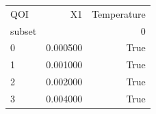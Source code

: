 \begin{tabular}{lrr}
\toprule
QOI & X1 & Temperature \\
subset &  & 0 \\
\midrule
0 & 0.000500 & True \\
1 & 0.001000 & True \\
2 & 0.002000 & True \\
3 & 0.004000 & True \\
\bottomrule
\end{tabular}
